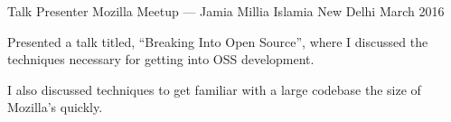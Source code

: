 
\begin{cventries}

  \cventry%
    {Talk Presenter} %
    {Mozilla Meetup --- Jamia Millia Islamia} %
    {New Delhi} %
    {March 2016} %
    {%
      \begin{cvitems} %
        \item{Presented a talk titled, ``Breaking Into Open Source'', where I discussed the techniques necessary for getting into OSS development.}
        \item{I also discussed techniques to get familiar with a large codebase the size of Mozilla's quickly.}
      \end{cvitems}
    }

\end{cventries}

